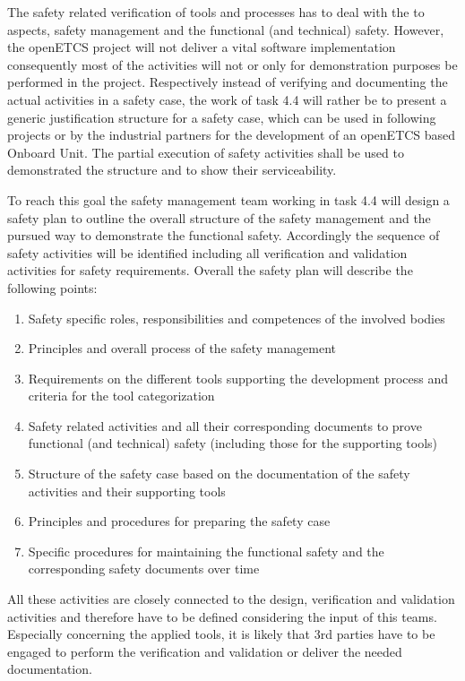 The safety related verification of tools and processes has to deal with the to aspects, safety management and the functional (and technical) safety. However, the openETCS project will not deliver a vital software implementation consequently most of the activities will not or only for demonstration purposes be performed in the project. Respectively instead of verifying and documenting the actual activities in a safety case, the work of task 4.4 will rather be to present a generic justification structure for a safety case, which can be used in following projects or by the industrial partners for the development of an openETCS based Onboard Unit. The partial execution of safety activities shall be used to demonstrated the structure and to show their serviceability. 

To reach this goal the safety management team working in task 4.4 will design a safety plan to outline the overall structure of the safety management and the pursued way to demonstrate the functional safety. Accordingly the sequence of safety activities will be identified including all verification and validation activities for safety requirements. Overall the safety plan will describe the following points:
\begin{enumerate}
\item  Safety specific roles, responsibilities and competences of the involved bodies
\item  Principles and overall process of the safety management
\item  Requirements on the different tools supporting the development process and criteria for the tool categorization
\item  Safety related activities and all their corresponding documents to prove functional (and technical) safety (including those for the supporting tools)
\item  Structure of the safety case based on the documentation of the safety activities and their supporting tools
\item  Principles and procedures for preparing the safety case
\item  Specific procedures for maintaining the functional safety and the corresponding safety documents over time
\end{enumerate}

All these activities are closely connected to the design, verification and validation activities and therefore have to be defined considering the input of this teams. Especially concerning the applied tools, it is likely that 3rd parties have to be engaged to perform the verification and validation or deliver the needed documentation.

